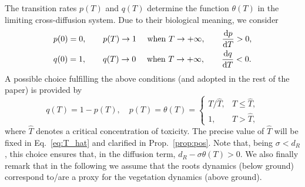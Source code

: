 \documentclass[11pt]{elsarticle}
\theoremstyle{plain}
\theoremstyle{definition}
\theoremstyle{myremark}
\newcommand{\q}[1]{\todo[inline, color=orange!30]{\textbf{Q: }#1}}
\begin{document}
The transition rates $p(T)$ and $q(T)$ determine the function $\theta(T)$ in the limiting cross-diffusion system. Due to their biological meaning, we consider
\begin{equation}
\begin{aligned}
&p(0)=0,\qquad  p(T)\to 1 \quad \textnormal{ when }T\to+\infty, \qquad \dfrac{\textnormal{d}p}{\textnormal{d}T}>0,\\
&q(0)=1, \qquad q(T)\to 0 \quad \textnormal{ when } T\to+\infty, \qquad \dfrac{\textnormal{d}q}{\textnormal{d}T}<0.
\end{aligned}
\label{eq:properties_pq}
\end{equation}
A possible choice fulfilling the above conditions (and adopted in the rest of the paper) is provided by
\begin{equation}
q(T)=1-p(T),\quad 
p(T)=\theta(T)=\begin{cases}
    T/\hat{T},&T\leq \hat{T},\\
    1, & T> \hat{T},
\end{cases}
\label{eq:pqt}
\end{equation}
where $\hat{T}$ denotes a critical concentration of toxicity. 
The precise value of $\hat{T}$ will be fixed in Eq.~\eqref{eq:T_hat} and clarified in Prop.~\ref{prop:pos}. 
Note that, being $\sigma<d_R$, this choice ensures that, in the diffusion term, $d_R-\sigma \theta(T)>0$.
We also finally remark that in the following we assume that the roots dynamics (below ground) correspond to/are a proxy for the vegetation dynamics (above ground).

\end{document}
